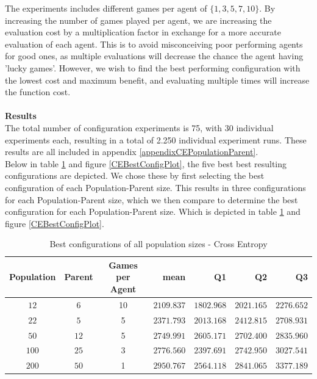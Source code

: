 The experiments includes different games per agent of $\{1,3,5,7,10\}$. By increasing the number of games 
played per agent, we are increasing the evaluation cost by a multiplication factor in exchange for a more 
accurate evaluation of each agent. This is to avoid misconceiving poor performing agents
for good ones, as multiple evaluations will decrease the chance the agent having 
'lucky games'. However, we wish to find 
the best performing configuration with the lowest cost and maximum benefit, and evaluating multiple 
times will increase the function cost.\\
\\
\textbf{Results}\\
The total number of configuration experiments is 75, with 30 individual experiments each,
resulting in a total of 2.250 individual experiment runs. These results are all included in 
appendix \ref{appendixCEPopulationParent}.\\
Below in table \ref{CEBestConfigTable} and figure \ref{CEBestConfigPlot}, the five best
best resulting configurations are depicted. We chose these by first selecting the best 
configuration of each Population-Parent size. This results in three
configurations for each Population-Parent size, which we then compare to determine the best
configuration for each Population-Parent size. Which is depicted in table \ref{CEBestConfigTable} and figure \ref{CEBestConfigPlot}.
\begin{table}[H]
\centering
\small
\begin{tabular}{c c c r r r r}
Population & Parent & Games per Agent & mean & Q1 & Q2 & Q3\\
\hline
$12$ & $6$ & 10 & $2109.837$ & $1802.968$ & $2021.165$ & $2276.652$\\
$22$ & $5$ & 5 & $2371.793$ & $2013.168$ & $2412.815$ & $2708.931$\\
$50$ & $12$ & 5 & $2749.991$ & $2605.171$ & $2702.400$ & $2835.960$\\
$100$ & $25$ & 3 & $2776.560$ & $2397.691$ & $2742.950$ & $3027.541$\\
$200$ & $50$ & 1 & $2950.767$ & $2564.118$ & $2841.065$ & $3377.189$\\
\end{tabular}
\caption{Best configurations of all population sizes - Cross Entropy \label{CEBestConfigTable}}
\end{table}

